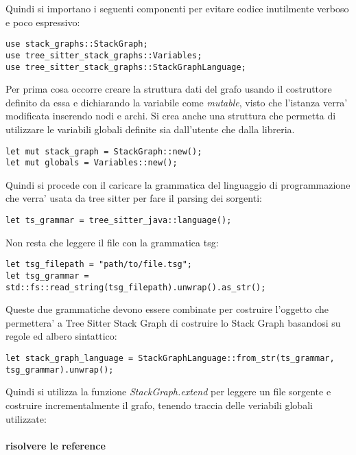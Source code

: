 Quindi si importano i seguenti componenti per evitare codice inutilmente verboso e poco espressivo:
\begin{Verbatim}[samepage=true]
use stack_graphs::StackGraph;
use tree_sitter_stack_graphs::Variables; 
use tree_sitter_stack_graphs::StackGraphLanguage; 
\end{Verbatim}

Per prima cosa occorre creare la struttura dati del grafo usando il costruttore definito da essa e dichiarando la variabile come \emph{mutable}, visto che l'istanza verra' modificata inserendo nodi e archi.
Si crea anche una struttura che permetta di utilizzare le variabili globali definite sia dall'utente che dalla libreria.

\begin{Verbatim}[samepage=true]
let mut stack_graph = StackGraph::new();
let mut globals = Variables::new();
\end{Verbatim}

Quindi si procede con il caricare la grammatica del linguaggio di programmazione che verra' usata da tree sitter per fare il parsing dei sorgenti:

\begin{Verbatim}[samepage=true]
let ts_grammar = tree_sitter_java::language();
\end{Verbatim}

Non resta che leggere il file con la grammatica tsg:

\begin{Verbatim}[samepage=true]
let tsg_filepath = "path/to/file.tsg";
let tsg_grammar = std::fs::read_string(tsg_filepath).unwrap().as_str();
\end{Verbatim}

Queste due grammatiche devono essere combinate per costruire l'oggetto che permettera' a Tree Sitter Stack Graph di costruire lo Stack Graph basandosi su regole ed albero sintattico:

\begin{Verbatim}[samepage=true]
let stack_graph_language = StackGraphLanguage::from_str(ts_grammar, tsg_grammar).unwrap();
\end{Verbatim}

Quindi si utilizza la funzione \emph{StackGraph.extend} per leggere un file sorgente e costruire incrementalmente il grafo, tenendo traccia delle veriabili globali utilizzate:

\paragraph{risolvere le reference}

